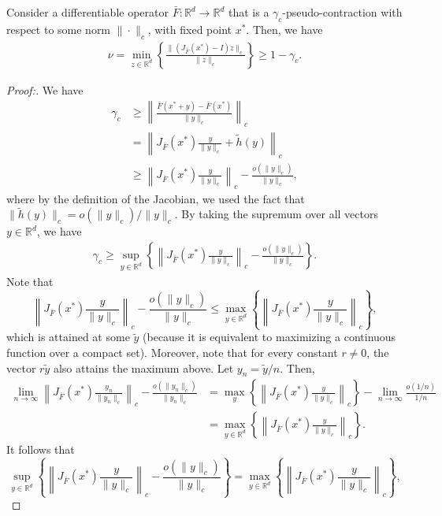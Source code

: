 \documentclass[letterpaper, 10 pt]{article}
\begin{document}
\begin{lemma}\label{lem:nu_gammac}
    Consider a differentiable operator $\bar{F}:\mathbb{R}^d\rightarrow \mathbb{R}^d$ that is a $\gamma_c$-pseudo-contraction with respect to some norm $\|\cdot\|_c$, with fixed point $x^*$. Then, we have
    \begin{align*}
        \nu = \min_{z\in\mathbb{R}^d} \left\{ \frac{\|(J_{\bar{F}}(x^*)-I)z\|_c}{\|z\|_c} \right\} \geq 1-\gamma_c.
    \end{align*}
\end{lemma}
\begin{proof}[Proof:]
We have
\begin{align*}
    \gamma_c &\geq \left\| \frac{\bar{F}(x^*+y)-\bar{F}(x^*)}{\|y\|_c} \right\|_c \tag{Pseudo-contraction property} \\
    &= \left\| J_{\bar{F}}(x^*) \frac{y}{\|y\|_c} + \tilde{h}(y) \right\|_c  \tag{definition of Jacobian matrix} \\
    &\geq \left\| J_{\bar{F}}(x^*) \frac{y}{\|y\|_c} \right\|_c - \frac{o(\|y\|_c)}{\|y\|_c},\tag{triangle inequality}
\end{align*}
where by the definition of the Jacobian, we used the fact that  $\|\tilde{h}(y)\|_c = o(\|y\|_c)/\|y\|_c$. By taking the supremum over all vectors $y\in\mathbb{R}^d$, we have
\begin{align*}
    \gamma_c \geq \sup_{y\in\mathbb{R}^d} \left\{ \left\| J_{\bar{F}}(x^*) \frac{y}{\|y\|_c} \right\|_c - \frac{o(\|y\|_c)}{\|y\|_c} \right\}.
\end{align*}
Note that 
\[ \left\| J_{\bar{F}}(x^*) \frac{y}{\|y\|_c} \right\|_c - \frac{o(\|y\|_c)}{\|y\|_c}  \leq \max_{y\in\mathbb{R}^d} \left\{ \left\| J_{\bar{F}}(x^*) \frac{y}{\|y\|_c} \right\|_c \right\}, \]
which is attained at some $\tilde{y}$ (because it is equivalent to maximizing a continuous function over a compact set). Moreover, note that for every constant $r\neq 0$, the vector $r\tilde{y}$ also attains the maximum above. Let $y_n = \tilde{y}/n$. Then, 
\begin{align*}
    \lim\limits_{n\to\infty} \left\| J_{\bar{F}}(x^*) \frac{y_n}{\|y_n\|_c} \right\|_c - \frac{o(\|y_n\|_c)}{\|y_n\|_c} &= \max_y \left\{ \left\| J_{\bar{F}}(x^*) \frac{y}{\|y\|_c} \right\|_c \right\} - \lim\limits_{n\to\infty} \frac{o(1/n)}{1/n} \\
    &= \max_{y\in\mathbb{R}^d} \left\{ \left\| J_{\bar{F}}(x^*) \frac{y}{\|y\|_c} \right\|_c \right\}.
\end{align*}
It follows that
\[ \sup_{y\in\mathbb{R}^d} \left\{ \left\| J_{\bar{F}}(x^*) \frac{y}{\|y\|_c} \right\|_c - \frac{o(\|y\|_c)}{\|y\|_c} \right\} = \max_{y\in\mathbb{R}^d} \left\{ \left\| J_{\bar{F}}(x^*) \frac{y}{\|y\|_c} \right\|_c \right\}, \]

\end{proof}
\end{document}
